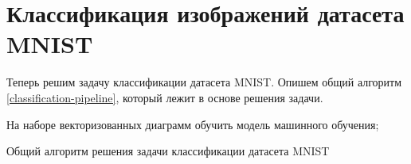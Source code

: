 \section{Классификация изображений датасета MNIST}

Теперь решим задачу классификации датасета MNIST. Опишем общий алгоритм \ref{classification-pipeline}, который лежит в основе решения задачи.

\medskip
\begin{algorithm}[H]
	\small
	\SetAlgoLined
	
	На наборе векторизованных диаграмм обучить модель машинного обучения;
	
	
	\caption{Общий алгоритм решения задачи классификации датасета MNIST}
	\label{classification-pipeline}
\end{algorithm}
\medskip